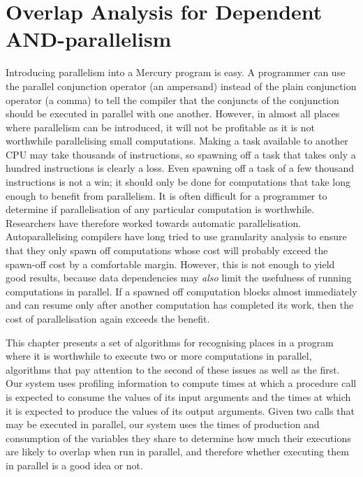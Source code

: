 
\chapter{Overlap Analysis for Dependent AND-parallelism}
\label{chap:overlap}


Introducing parallelism into a Mercury program is easy.
A programmer can use the parallel conjunction operator (an ampersand)
instead of the plain conjunction operator (a comma) to tell the compiler
that the conjuncts of the conjunction should be executed in parallel with
one another.
However,
in almost all places where parallelism can be introduced,
it will not be
profitable as it is not worthwhile parallelising small computations.
Making a task available to another CPU
may take thousands of instructions,
so spawning off a task that takes only a hundred instructions is clearly a
loss.
Even spawning off a task of a few thousand instructions is not a win;
it should only be done for computations
that take long enough to benefit from parallelism.
It is often difficult for a programmer to determine if parallelisation of
any particular computation is worthwhile.
Researchers have therefore worked towards automatic parallelisation.
Autoparallelising compilers have long tried to use granularity analysis to
ensure that they only spawn off computations whose cost will probably exceed
the spawn-off cost by a comfortable margin.
However, this is not enough to yield good results,
because data dependencies may \emph{also} limit
the usefulness of running computations in parallel.
If a spawned off computation blocks almost immediately
and can resume only after another computation has completed its work,
then the cost of parallelisation again exceeds the benefit.

%

This chapter presents a set of algorithms for recognising places in a
program where it is worthwhile to execute two or more computations in
parallel,
algorithms that pay attention to the second of these issues as well as the
first.
Our system uses profiling information to compute
times at which a procedure call is expected to consume the values of its
input arguments
and the times at which it is expected to produce the values of its output
arguments.
Given two calls that may be executed in parallel,
our system uses the times of production and consumption
of the variables they share
to determine how much their executions are likely to overlap
when run in parallel,
and therefore whether executing them in parallel is a good idea or not.

